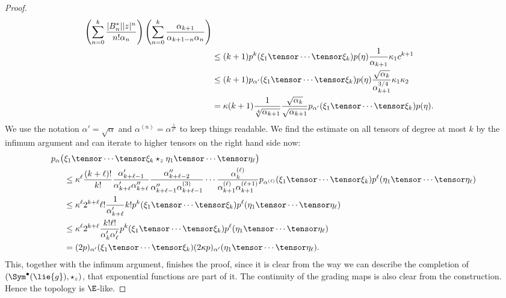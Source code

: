 \documentclass[
11pt,                          %
english                        %
]{article}
\begin{document}
\begin{proof}
\begin{align*}
		\left(
			\sum\limits_{n=0}^k
			\frac{|B_n^*| |z|^n}{n! \alpha_n}
		\right)
		\left(
			\sum\limits_{n=0}^k
			\frac{\alpha_{k+1}}{\alpha_{k+1-n} \alpha_n}
		\right)
		\\
		& \leq
		(k+1) 
		p^k(\xi_1 \tensor \cdots \tensor \xi_k)
		p(\eta)
		\frac{1}{\alpha_{k+1}}
		\kappa_1
		c^{k+1}
		\\
		& \leq
		(k+1) 
		p_{\alpha'}(\xi_1 \tensor \cdots \tensor \xi_k)
		p(\eta)
		\frac{\sqrt{\alpha_k}}{\alpha_{k+1}^{3/4}}
		\kappa_1
		\kappa_2
		\\
		&=
		\kappa
		(k+1)
		\frac{1}{\sqrt[4]{\alpha_{k+1}}}
		\frac{\sqrt{\alpha_k}}{\sqrt{\alpha_{k+1}}}
		p_{\alpha'}(\xi_1 \tensor \cdots \tensor \xi_k)
		p(\eta).
	\end{align*}
	We use the notation $\alpha' = \sqrt{\alpha}$ and $\alpha^{(n)} = 
	\alpha^{\frac{1}{2^n}}$ to keep things readable. We find the estimate on all 
	tensors of degree at most $k$ by the infimum argument and can iterate to higher 
	tensors on the right hand side now:
	\begin{align*}
		p_\alpha \big(
		&
			\xi_1 \tensor \cdots \tensor \xi_k
			\star_z
			\eta_1 \tensor \cdots \tensor \eta_\ell
		\big)
		\\
		& \leq
		\kappa^\ell
		\frac{(k + \ell)!}{k!}
		\frac{\alpha_{k + \ell - 1}'}{\alpha_{k + \ell}' \alpha_{k+\ell}''}
		\frac{\alpha_{k + \ell - 2}''}
		{\alpha_{k + \ell - 1}'' \alpha_{k+\ell-1}^{(3)}}
		\cdots
		\frac{\alpha_{k}^{(\ell)}}
		{\alpha_{k + 1}^{(\ell)} \alpha_{k+1}^{(\ell + 1)}}
		p_{\alpha^{(\ell)}} (\xi_1 \tensor \cdots \tensor \xi_k)
		p^\ell ( \eta_1 \tensor \cdots \tensor \eta_\ell )
		\\
		& \leq
		\kappa^\ell
		2^{k + \ell}
		\ell!
		\frac{1}{\alpha_{k + \ell}'}
		k!
		p^k (\xi_1 \tensor \cdots \tensor \xi_k)
		p^\ell ( \eta_1 \tensor \cdots \tensor \eta_\ell )
		\\
		& \leq
		\kappa^\ell
		2^{k + \ell}
		\frac{k! \ell!}{\alpha_k' \alpha_\ell '}
		p^k (\xi_1 \tensor \cdots \tensor \xi_k)
		p^\ell ( \eta_1 \tensor \cdots \tensor \eta_\ell )
		\\
		&=
		(2p)_{\alpha'} (\xi_1 \tensor \cdots \tensor \xi_k)
		(2 \kappa p)_{\alpha'} ( \eta_1 \tensor \cdots \tensor \eta_\ell ).
	\end{align*}
	This, together with the infimum argument, finishes the proof, since it is clear 
	from the way we can describe the completion of $\left( \Sym^{\bullet}(\lie{g}), 
	\star_z \right)$, that exponential functions are part of it. The continuity of 
	the grading maps is also clear from the construction. Hence the topology is 
	$\E$-like.
\end{proof}
\end{document}
